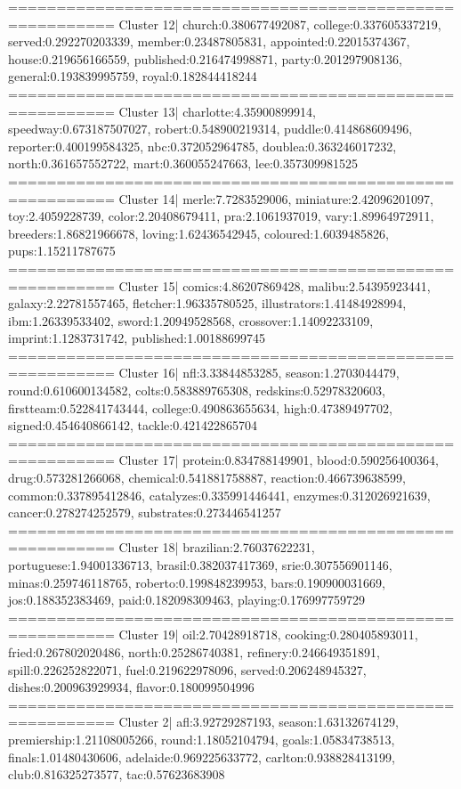 ========================================================= 
Cluster 12| church:0.380677492087, college:0.337605337219, served:0.292270203339, member:0.23487805831, appointed:0.22015374367, house:0.219656166559, published:0.216474998871, party:0.201297908136, general:0.193839995759, royal:0.182844418244
========================================================= 
Cluster 13| charlotte:4.35900899914, speedway:0.673187507027, robert:0.548900219314, puddle:0.414868609496, reporter:0.400199584325, nbc:0.372052964785, doublea:0.363246017232, north:0.361657552722, mart:0.360055247663, lee:0.357309981525
========================================================= 
Cluster 14| merle:7.7283529006, miniature:2.42096201097, toy:2.4059228739, color:2.20408679411, pra:2.1061937019, vary:1.89964972911, breeders:1.86821966678, loving:1.62436542945, coloured:1.6039485826, pups:1.15211787675
========================================================= 
Cluster 15| comics:4.86207869428, malibu:2.54395923441, galaxy:2.22781557465, fletcher:1.96335780525, illustrators:1.41484928994, ibm:1.26339533402, sword:1.20949528568, crossover:1.14092233109, imprint:1.1283731742, published:1.00188699745
========================================================= 
Cluster 16| nfl:3.33844853285, season:1.2703044479, round:0.610600134582, colts:0.583889765308, redskins:0.52978320603, firstteam:0.522841743444, college:0.490863655634, high:0.47389497702, signed:0.454640866142, tackle:0.421422865704
========================================================= 
Cluster 17| protein:0.834788149901, blood:0.590256400364, drug:0.573281266068, chemical:0.541881758887, reaction:0.466739638599, common:0.337895412846, catalyzes:0.335991446441, enzymes:0.312026921639, cancer:0.278274252579, substrates:0.273446541257
========================================================= 
Cluster 18| brazilian:2.76037622231, portuguese:1.94001336713, brasil:0.382037417369, srie:0.307556901146, minas:0.259746118765, roberto:0.199848239953, bars:0.190900031669, jos:0.188352383469, paid:0.182098309463, playing:0.176997759729
========================================================= 
Cluster 19| oil:2.70428918718, cooking:0.280405893011, fried:0.267802020486, north:0.25286740381, refinery:0.246649351891, spill:0.226252822071, fuel:0.219622978096, served:0.206248945327, dishes:0.200963929934, flavor:0.180099504996
========================================================= 
Cluster 2| afl:3.92729287193, season:1.63132674129, premiership:1.21108005266, round:1.18052104794, goals:1.05834738513, finals:1.01480430606, adelaide:0.969225633772, carlton:0.938828413199, club:0.816325273577, tac:0.57623683908
